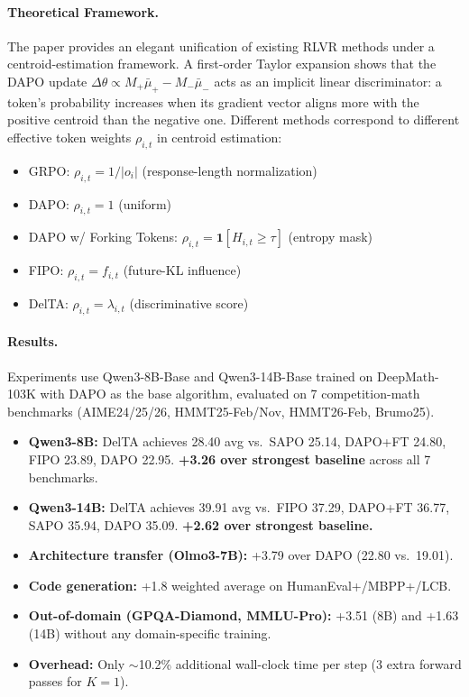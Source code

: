 \documentclass[11pt,a4paper]{article}
\begin{document}
\paragraph{Theoretical Framework.}
The paper provides an elegant unification of existing RLVR methods under a centroid-estimation framework. A first-order Taylor expansion shows that the DAPO update $\Delta\theta \propto M_+ \bar{\mu}_+ - M_- \bar{\mu}_-$ acts as an implicit linear discriminator: a token's probability increases when its gradient vector aligns more with the positive centroid than the negative one. Different methods correspond to different effective token weights $\rho_{i,t}$ in centroid estimation:
\begin{itemize}[nosep]
    \item GRPO: $\rho_{i,t} = 1/|o_i|$ (response-length normalization)
    \item DAPO: $\rho_{i,t} = 1$ (uniform)
    \item DAPO w/ Forking Tokens: $\rho_{i,t} = \mathbf{1}[H_{i,t} \geq \tau]$ (entropy mask)
    \item FIPO: $\rho_{i,t} = f_{i,t}$ (future-KL influence)
    \item DelTA: $\rho_{i,t} = \lambda_{i,t}$ (discriminative score)
\end{itemize}

\paragraph{Results.}
Experiments use Qwen3-8B-Base and Qwen3-14B-Base trained on DeepMath-103K with DAPO as the base algorithm, evaluated on 7 competition-math benchmarks (AIME24/25/26, HMMT25-Feb/Nov, HMMT26-Feb, Brumo25).

\begin{itemize}[nosep]
    \item \textbf{Qwen3-8B:} DelTA achieves 28.40 avg vs.\ SAPO 25.14, DAPO+FT 24.80, FIPO 23.89, DAPO 22.95. \textbf{+3.26 over strongest baseline} across all 7 benchmarks.
    \item \textbf{Qwen3-14B:} DelTA achieves 39.91 avg vs.\ FIPO 37.29, DAPO+FT 36.77, SAPO 35.94, DAPO 35.09. \textbf{+2.62 over strongest baseline.}
    \item \textbf{Architecture transfer (Olmo3-7B):} +3.79 over DAPO (22.80 vs.\ 19.01).
    \item \textbf{Code generation:} +1.8 weighted average on HumanEval+/MBPP+/LCB.
    \item \textbf{Out-of-domain (GPQA-Diamond, MMLU-Pro):} +3.51 (8B) and +1.63 (14B) without any domain-specific training.
    \item \textbf{Overhead:} Only $\sim$10.2\% additional wall-clock time per step (3 extra forward passes for $K=1$).
\end{itemize}
\end{document}
